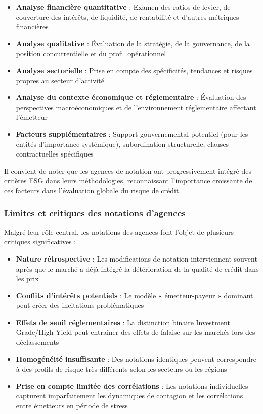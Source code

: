 \begin{itemize}
    \item \textbf{Analyse financière quantitative} : Examen des ratios de levier, de couverture des intérêts, de liquidité, de rentabilité et d'autres métriques financières
    
    \item \textbf{Analyse qualitative} : Évaluation de la stratégie, de la gouvernance, de la position concurrentielle et du profil opérationnel
    
    \item \textbf{Analyse sectorielle} : Prise en compte des spécificités, tendances et risques propres au secteur d'activité
    
    \item \textbf{Analyse du contexte économique et réglementaire} : Évaluation des perspectives macroéconomiques et de l'environnement réglementaire affectant l'émetteur
    
    \item \textbf{Facteurs supplémentaires} : Support gouvernemental potentiel (pour les entités d'importance systémique), subordination structurelle, clauses contractuelles spécifiques
\end{itemize}

Il convient de noter que les agences de notation ont progressivement intégré des critères ESG dans leurs méthodologies, reconnaissant l'importance croissante de ces facteurs dans l'évaluation globale du risque de crédit.

\subsubsection{Limites et critiques des notations d'agences}

Malgré leur rôle central, les notations des agences font l'objet de plusieurs critiques significatives :

\begin{itemize}
    \item \textbf{Nature rétrospective} : Les modifications de notation interviennent souvent après que le marché a déjà intégré la détérioration de la qualité de crédit dans les prix
    
    \item \textbf{Conflits d'intérêts potentiels} : Le modèle « émetteur-payeur » dominant peut créer des incitations problématiques
    
    \item \textbf{Effets de seuil réglementaires} : La distinction binaire Investment Grade/High Yield peut entraîner des effets de falaise sur les marchés lors des déclassements
    
    \item \textbf{Homogénéité insuffisante} : Des notations identiques peuvent correspondre à des profils de risque très différents selon les secteurs ou les régions
    
    \item \textbf{Prise en compte limitée des corrélations} : Les notations individuelles capturent imparfaitement les dynamiques de contagion et les corrélations entre émetteurs en période de stress
\end{itemize}

